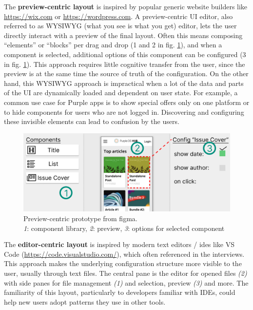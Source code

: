 The \textbf{preview-centric layout} is inspired by popular generic website builders like \url{https://wix.com} or \url{https://wordpress.com}.
A preview-centric UI editor, also referred to as WYSIWYG (what you see is what you get) editor, lets the user directly interact with a preview of the final layout.
Often this means composing ``elements'' or ``blocks'' per drag and drop (1 and 2 in fig. \ref{fig:preview-centric}), and when a component is selected, additional options of this component can be configured (3 in fig. \ref{fig:preview-centric}).
This approach requires little cognitive transfer from the user, since the preview is at the same time the source of truth of the configuration.
On the other hand, this WYSIWYG approach is impractical when a lot of the data and parts of the UI are dynamically loaded and dependent on user state.
For example, a common use case for Purple apps is to show special offers only on one platform or to hide components for users who are not logged in.
Discovering and configuring these invisible elements can lead to confusion by the users. 
\begin{figure}[h!]
  \includegraphics[width=\textwidth]{pics/preview_centric.png}
  \caption[Preview-centric prototype]{Preview-centric prototype from figma.\\\textit{1}: component library, \textit{2}: preview, \textit{3}: options for selected component}
  \label{fig:preview-centric}
\end{figure}
\newpage
The \textbf{editor-centric layout} is inspired by modern text editors / \Gls{ide}s like VS Code (\url{https://code.visualstudio.com/}), which often referenced in the interviews.
This approach makes the underlying configuration structure more visible to the user, usually through text files.
The central pane is the editor for opened files \textit{(2)} with side panes for file management \textit{(1)} and selection, preview \textit{(3)} and more.
The familiarity of this layout, particularly to developers familiar with IDEs, could help new users adopt patterns they use in other tools.
